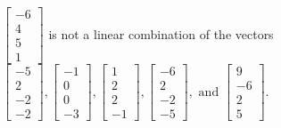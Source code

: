 \begin{exercise}
\begin{exerciseStatement}
  \end{exerciseStatement}
  \begin{exerciseAnswer}
   \(\left[\begin{array}{c}
-6 \\
4 \\
5 \\
1
\end{array}\right]\) 
  	 is not  
	a linear combination of the vectors \(\left[\begin{array}{c}
-5 \\
2 \\
-2 \\
-2
\end{array}\right] , \left[\begin{array}{c}
-1 \\
0 \\
0 \\
-3
\end{array}\right] , \left[\begin{array}{c}
1 \\
2 \\
2 \\
-1
\end{array}\right] , \left[\begin{array}{c}
-6 \\
2 \\
-2 \\
-5
\end{array}\right] , \text{ and } \left[\begin{array}{c}
9 \\
-6 \\
2 \\
5
\end{array}\right]\).

	
  


  \end{exerciseAnswer}
\end{exercise}